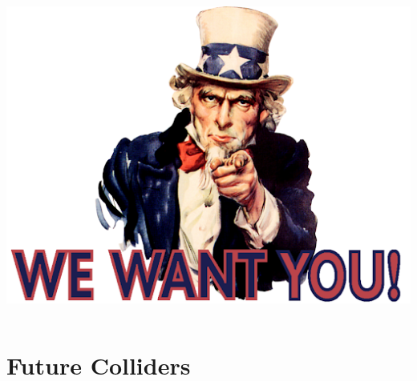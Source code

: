 \documentclass[aspectratio=169]{beamer}
\begin{document}
\begin{frame}
\begin{columns}

    \vspace{-3ex}
    \begin{center}
      \includegraphics[width=0.8\linewidth]{figures/weWantYou.png}\\
    \end{center}
  \end{columns}
\end{frame}

\section{Future Colliders}
\end{document}
